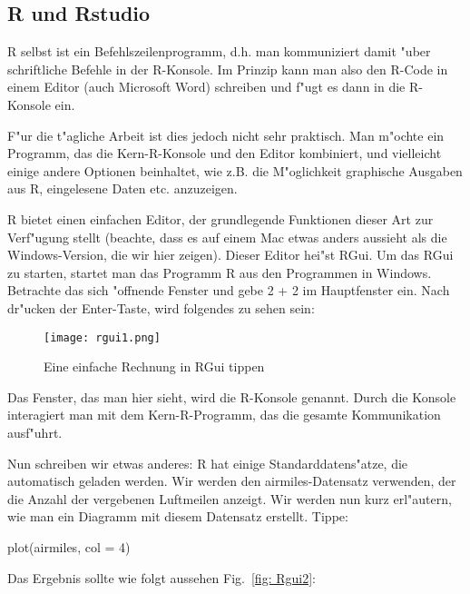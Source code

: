 \documentclass[a4paper,twoside]{tufte-book}\usepackage[]{graphicx}\usepackage[]{color}
\begin{document}
\begin{appendices}

\chapter{R und Rstudio}

R selbst ist ein Befehlszeilenprogramm, d.h. man kommuniziert damit "uber schriftliche Befehle in der R-Konsole. Im Prinzip kann man also den R-Code in einem Editor (auch Microsoft Word) schreiben und f"ugt es dann in die R-Konsole ein.

F"ur die t"agliche Arbeit ist dies jedoch nicht sehr praktisch. Man m"ochte ein Programm, das die Kern-R-Konsole und den Editor kombiniert, und vielleicht einige andere Optionen beinhaltet, wie z.B. die M"oglichkeit graphische Ausgaben aus R, eingelesene Daten etc. anzuzeigen. 


R bietet einen einfachen Editor, der grundlegende Funktionen dieser Art zur Verf"ugung stellt (beachte, dass es auf einem Mac etwas anders aussieht als die Windows-Version, die wir hier zeigen). Dieser Editor hei"st RGui. Um das RGui zu starten, startet man das Programm R aus den Programmen in Windows. Betrachte das sich "offnende Fenster und gebe 2 + 2 im Hauptfenster ein. Nach dr"ucken der Enter-Taste, wird folgendes zu sehen sein:

\begin{figure}[]
\begin{center}
\texttt{[image: rgui1.png]}
\caption{Eine einfache Rechnung in RGui tippen}
\label{fig: Rgui1}
\end{center}
\end{figure}


Das Fenster, das man hier sieht, wird die R-Konsole genannt. Durch die Konsole interagiert man mit dem Kern-R-Programm, das die gesamte Kommunikation ausf"uhrt.

Nun schreiben wir etwas anderes: R hat einige Standarddatens"atze, die automatisch geladen werden. Wir werden den airmiles-Datensatz verwenden, der die Anzahl der vergebenen Luftmeilen anzeigt. Wir werden nun kurz erl"autern, wie man ein Diagramm mit diesem Datensatz erstellt. Tippe:

\begin{Schunk}
\begin{Sinput}
plot(airmiles, col = 4)
\end{Sinput}
\end{Schunk}

Das Ergebnis sollte wie folgt aussehen Fig.~\ref{fig: Rgui2}:


\end{appendices}
\end{document}
